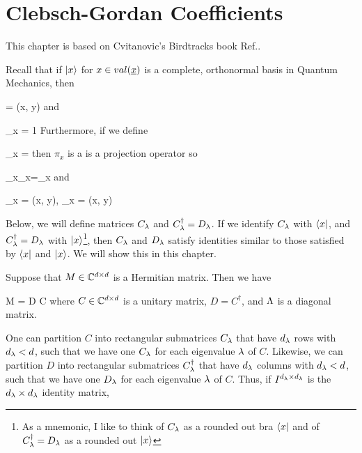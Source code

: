 \chapter{Clebsch-Gordan Coefficients}
\label{ch-clebsch-gordan}
This chapter is based on
Cvitanovic's Birdtracks book Ref.\cite{birdtracks-book}.

Recall that if $|x\rangle$ for
$x\in val(\rvx)$ is a complete, orthonormal
basis in Quantum Mechanics, then

\beq
{} =  \delta(x, y)
\quad
{}
\eeq
and

\beq
\sum_x  = 1
\quad
{}
\eeq
Furthermore, if we define

\beq
\pi_x = 
\eeq
then $\pi_x$ is a
is a projection operator so

\beq
\pi_x\pi_x=\pi_x
\eeq
and

\beq
\pi_x =  
\delta(x, y),\quad
{}\pi_x = 
\delta(x, y)
\eeq

Below, we will
define matrices $C_\lambda$ and $C^\dagger_\lambda = D_\lambda$.
If we identify $C_\lambda$
with $\langle x|$,
and $C^\dagger_\lambda=D_\lambda$
with
$|x\rangle$\footnote{
As a mnemonic, I like to think of 
$C_\lambda$ as a rounded 
out bra $\langle x|$
and of $C^\dagger_\lambda=D_\lambda$
as a rounded out  $|x\rangle$},
then $C_\lambda$ and $D_\lambda$
satisfy identities
similar to those satisfied by $\langle x|$ and $|x\rangle$. 
We will show this
in this chapter.



Suppose that  $M\in{ \mathbb{C}}^{d\times d}$ is a Hermitian matrix. Then we have

\beq
M = D \Lam C
\eeq
where 
$C\in { \mathbb{C}}^{d\times d}$ is a unitary matrix, $D=C^\dagger$, and $\Lambda$ is a diagonal matrix.



One can partition 
$C$ into rectangular submatrices $C_\lambda$ that have  $d_\lambda$ rows with $d_\lambda < d$, 
such that we have one $C_\lambda$
for each eigenvalue $\lambda$ of $C$.
Likewise, we can partition 
$D$ into rectangular submatrices $C^\dagger_\lambda$ that have $d_\lambda$ columns with $d_\lambda < d$, such that we have one $D_\lambda$
for each eigenvalue $\lambda$ of $C$. Thus, if $I^{d_\lambda\times d_\lambda}$
is the $d_\lambda\times d_\lambda$
identity matrix,

